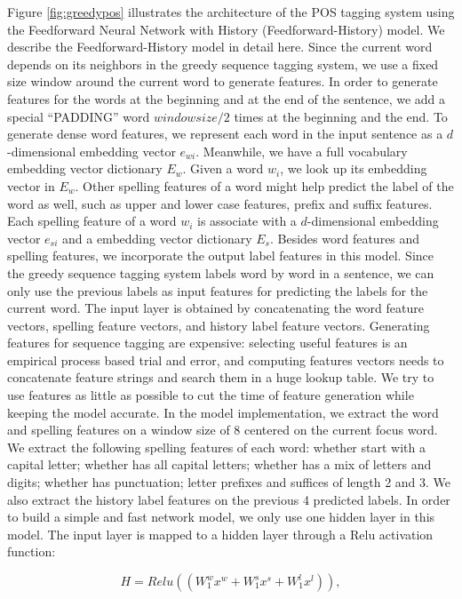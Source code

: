 \documentclass{sfuthesis}
\begin{document}
Figure \ref{fig:greedypos} illustrates the architecture of the POS tagging system using the Feedforward Neural Network with History (Feedforward-History) model. We describe the Feedforward-History model in detail here. Since the current word depends on its neighbors in the greedy sequence tagging system, we use a fixed size window around the current word to generate features. In order to generate features for the words at the beginning and at the end of the sentence, we add a special “PADDING” word $window size/2$ times at the beginning and the end. To generate dense word features, we represent each word in the input sentence as a $d$-dimensional embedding vector $e_{wi}$. Meanwhile, we have a full vocabulary embedding vector dictionary $E_{w}$. Given a word $w_{i}$, we look up its embedding vector in $E_{w}$. Other spelling features of a word might help predict the label of the word as well, such as upper and lower case features, prefix and suffix features. Each spelling feature of a word $w_{i}$ is associate with a $d$-dimensional embedding vector $e_{si}$ and a embedding vector dictionary $E_{s}$. Besides word features and spelling features, we incorporate the output label features in this model. Since the greedy sequence tagging system labels word by word in a sentence, we can only use the previous labels as input features for predicting the labels for the current word. The input layer is obtained by concatenating the word feature vectors, spelling feature vectors, and history label feature vectors. Generating features for sequence tagging are expensive: selecting useful features is an empirical process based trial and error, and computing features vectors needs to concatenate feature strings and search them in a huge lookup table. We try to use features as little as possible to cut the time of feature generation while keeping the model accurate. In the model implementation, we extract the word and spelling features on a window size of 8 centered on the current focus word. We extract the following spelling features of each word: whether start with a capital letter; whether has all capital letters; whether has a mix of letters and digits; whether has punctuation; letter prefixes and suffices of length 2 and 3. We also extract the history label features on the previous 4 predicted labels. In order to build a simple and fast network model, we only use one hidden layer in this model. The input layer is mapped to a hidden layer through a Relu activation function:

\begin{equation}
H=Relu\left(\left( W_{1}^{w}x^{w}+W_{1}^{s}x^{s}+W_{1}^{l}x^{l}\right)\right),
\end{equation}
\end{document}
